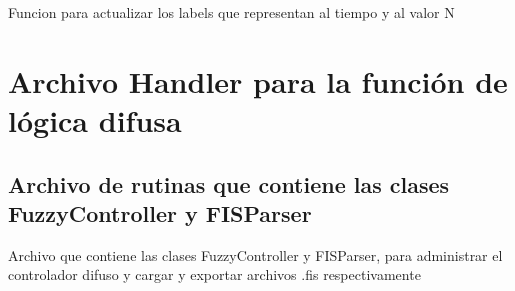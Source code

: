 \documentclass[letterpaper,10pt,spanish]{sphinxmanual}
\begin{document}

\begin{fulllineitems}
\label{\detokenize{codigos/TuningHandler:TuningHandler.update_time_and_N_labels}}
Funcion para actualizar los labels que representan al tiempo y al valor N

\end{fulllineitems}



\section{Archivo Handler para la función de lógica difusa}
\label{\detokenize{codigos/FuzzyHandler:archivo-handler-para-la-funcion-de-logica-difusa}}\label{\detokenize{codigos/FuzzyHandler::doc}}

\subsection{Archivo de rutinas que contiene las clases FuzzyController y FISParser}
\label{\detokenize{codigos/rutinas_fuzzy:module-rutinas_fuzzy}}\label{\detokenize{codigos/rutinas_fuzzy:archivo-de-rutinas-que-contiene-las-clases-fuzzycontroller-y-fisparser}}\label{\detokenize{codigos/rutinas_fuzzy::doc}}
Archivo que contiene las clases FuzzyController y FISParser, para administrar el controlador difuso y cargar y exportar archivos .fis respectivamente
\end{document}
